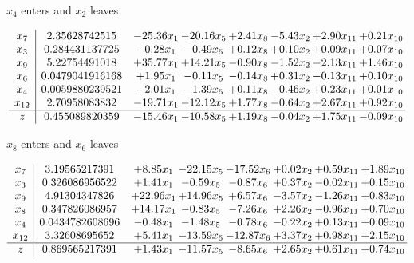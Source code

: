 \documentclass[9pt]{article}
\begin{document}
 $ x_{4} $ enters and $ x_{2} $ leaves 

 \[\begin{array}{c| c c@{\hskip 2pt} c@{\hskip 2pt} c@{\hskip 2pt} c@{\hskip 2pt} c@{\hskip 2pt} c@{\hskip 2pt} }
 x_{7}   &  2.35628742515 & -25.36 x_{1} & -20.16 x_{5} & +  2.41 x_{8} & -5.43 x_{2} & +  2.90 x_{11} & +  0.21 x_{10}\\
 x_{3}   &  0.284431137725 & -0.28 x_{1} & -0.49 x_{5} & +  0.12 x_{8} & +  0.10 x_{2} & +  0.09 x_{11} & +  0.07 x_{10}\\
 x_{9}   &  5.22754491018 & + 35.77 x_{1} & + 14.21 x_{5} & -0.90 x_{8} & -1.52 x_{2} & -2.13 x_{11} & +  1.46 x_{10}\\
 x_{6}   &  0.0479041916168 & +  1.95 x_{1} & -0.11 x_{5} & -0.14 x_{8} & +  0.31 x_{2} & -0.13 x_{11} & +  0.10 x_{10}\\
 x_{4}   &  0.0059880239521 & -2.01 x_{1} & -1.39 x_{5} & +  0.11 x_{8} & -0.46 x_{2} & +  0.23 x_{11} & +  0.01 x_{10}\\
 x_{12}   &  2.70958083832 & -19.71 x_{1} & -12.12 x_{5} & +  1.77 x_{8} & -0.64 x_{2} & +  2.67 x_{11} & +  0.92 x_{10}\\
\hline
z    &  0.455089820359 & -15.46 x_{1} & -10.58 x_{5} & +  1.19 x_{8} & -0.04 x_{2} & +  1.75 x_{11} & -0.09 x_{10}\\
\end{array}\]


 $ x_{8} $ enters and $ x_{6} $ leaves 

 \[\begin{array}{c| c c@{\hskip 2pt} c@{\hskip 2pt} c@{\hskip 2pt} c@{\hskip 2pt} c@{\hskip 2pt} c@{\hskip 2pt} }
 x_{7}   &  3.19565217391 & +  8.85 x_{1} & -22.15 x_{5} & -17.52 x_{6} & +  0.02 x_{2} & +  0.59 x_{11} & +  1.89 x_{10}\\
 x_{3}   &  0.326086956522 & +  1.41 x_{1} & -0.59 x_{5} & -0.87 x_{6} & +  0.37 x_{2} & -0.02 x_{11} & +  0.15 x_{10}\\
 x_{9}   &  4.91304347826 & + 22.96 x_{1} & + 14.96 x_{5} & +  6.57 x_{6} & -3.57 x_{2} & -1.26 x_{11} & +  0.83 x_{10}\\
 x_{8}   &  0.347826086957 & + 14.17 x_{1} & -0.83 x_{5} & -7.26 x_{6} & +  2.26 x_{2} & -0.96 x_{11} & +  0.70 x_{10}\\
 x_{4}   &  0.0434782608696 & -0.48 x_{1} & -1.48 x_{5} & -0.78 x_{6} & -0.22 x_{2} & +  0.13 x_{11} & +  0.09 x_{10}\\
 x_{12}   &  3.32608695652 & +  5.41 x_{1} & -13.59 x_{5} & -12.87 x_{6} & +  3.37 x_{2} & +  0.98 x_{11} & +  2.15 x_{10}\\
\hline
z    &  0.869565217391 & +  1.43 x_{1} & -11.57 x_{5} & -8.65 x_{6} & +  2.65 x_{2} & +  0.61 x_{11} & +  0.74 x_{10}\\
\end{array}\]
\end{document}
